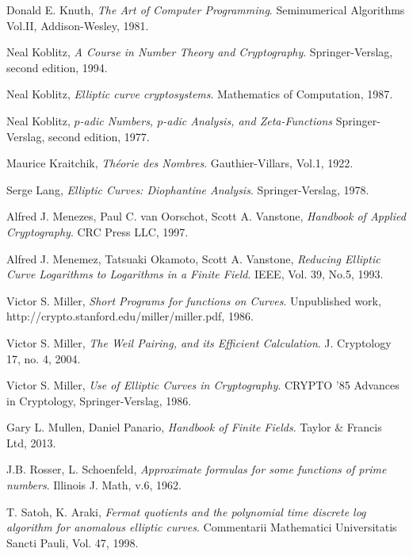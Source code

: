 \documentclass{article}
\numberwithin{equation}{section}
\theoremstyle{definition}
\begin{document}
\begin{thebibliography}{9}
  Donald E. Knuth,
  \emph{The Art of Computer Programming}.
  Seminumerical Algorithms Vol.II,
  Addison-Wesley,
  1981.

  Neal Koblitz,
  \emph{A Course in Number Theory and Cryptography}.
  Springer-Verslag,
  second edition,
  1994.

  Neal Koblitz,
  \emph{Elliptic curve cryptosystems}.
  Mathematics of Computation,
  1987.

  Neal Koblitz,
  \emph{$p$-adic Numbers, $p$-adic Analysis, and Zeta-Functions}
  Springer-Verslag,
  second edition,
  1977.

  Maurice Kraitchik,
  \emph{Th\'eorie des Nombres}.
  Gauthier-Villars,
  Vol.1,
  1922.

  Serge Lang,
  \emph{Elliptic Curves: Diophantine Analysis}.
  Springer-Verslag,
  1978.

  Alfred J. Menezes,
  Paul C. van Oorschot,
  Scott A. Vanstone,
  \emph{Handbook of Applied Cryptography}.
  CRC Press LLC,
  1997.

  Alfred J. Menemez,
  Tatsuaki Okamoto,
  Scott A. Vanstone,
  \emph{Reducing Elliptic Curve Logarithms to Logarithms in a Finite Field}. 
  IEEE, Vol. 39, No.5,
  1993.

  Victor S. Miller,
  \emph{Short Programs for functions on Curves}.
  Unpublished work,\\
  http://crypto.stanford.edu/miller/miller.pdf,
  1986.

  Victor S. Miller,
  \emph{The Weil Pairing, and its Efficient Calculation}.
  J. Cryptology 17,
  no. 4,
  2004.

  Victor S. Miller,
  \emph{Use of Elliptic Curves in Cryptography}.
  CRYPTO '85 Advances in Cryptology,
  Springer-Verslag,
  1986.


  Gary L. Mullen,
  Daniel Panario,
  \emph{Handbook of Finite Fields}.
  Taylor & Francis Ltd,
  2013.


  J.B. Rosser,
  L. Schoenfeld,
  \emph{Approximate formulas for some functions of prime numbers}.
  Illinois J. Math,
  v.6,
  1962.

  T. Satoh,
  K. Araki,
  \emph{Fermat quotients and the polynomial time discrete log algorithm for anomalous elliptic curves}.
  Commentarii Mathematici Universitatis Sancti Pauli,
  Vol. 47,
  1998.


\end{thebibliography}
\end{document}
